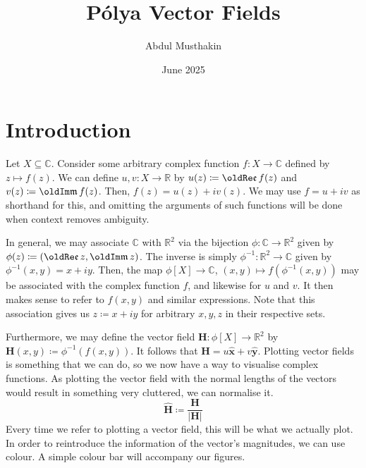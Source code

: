 \documentclass[a4paper]{article}
\title{P\'olya Vector Fields}
\author{Abdul Musthakin}
\date{June 2025}
\newcommand{\R}{\mathbb{R}}
\newcommand{\C}{\mathbb{C}}
\renewcommand{\Im}{\mathop{\oldIm\mathfrak{m}}}
\renewcommand{\Re}{\mathop{\oldRe\mathfrak{e}}}
\theoremstyle{definition}
\begin{document}
\maketitle

\section{Introduction}

Let $X \subseteq \C$.
Consider some arbitrary complex function $f \colon X \to \C$ defined by $z \mapsto f(z)$.
We can define $u,v \colon X \to \R$ by $u(z) \coloneq \Re f (z)$ and $v(z) \coloneq \Im f(z)$.
Then, $f(z) = u(z) + i v(z)$.
We may use $f = u + i v$ as shorthand for this, and omitting the arguments of such functions will be done when context removes ambiguity.

In general, we may associate $\mathbb{C}$ with $\R^2$ via the bijection $\phi \colon \C \to \R^2$ given by $\phi(z) \coloneq (\Re z, \Im z)$.
The inverse is simply $\phi^{-1} \colon \R^2 \to \C$ given by $\phi^{-1}(x,y) = x + iy$.
Then, the map $\phi[X] \to \C$, $(x,y) \mapsto f\left(\phi^{-1}(x,y)\right)$ may be associated with the complex function $f$, and likewise for $u$ and $v$.
It then makes sense to refer to $f(x,y)$ and similar expressions.
Note that this association gives us $z \coloneq x + iy$ for arbitrary $x,y,z$ in their respective sets.

Furthermore, we may define the vector field $\mathbf{H} \colon \phi[X] \to \R^2$ by $\mathbf{H}(x,y) \coloneq \phi^{-1} (f(x,y))$.
It follows that $\mathbf{H} = u\mathbf{\hat{x}} + v\mathbf{\hat{y}}$.
Plotting vector fields is something that we can do, so we now have a way to visualise complex functions.
As plotting the vector field with the normal lengths of the vectors would result in something very cluttered, we can normalise it.
\begin{equation*}
    \mathbf{\hat{H}} \coloneq \frac{\mathbf{H}}{\lvert \mathbf{H} \rvert}
\end{equation*}
Every time we refer to plotting a vector field, this will be what we actually plot.
In order to reintroduce the information of the vector's magnitudes, we can use colour.
A simple colour bar will accompany our figures.
\end{document}
